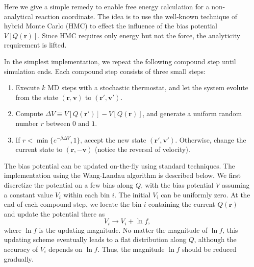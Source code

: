\documentclass{article}
\newcommand{\vct}[1]{\mathbf{#1}}
\newcommand{\vr}{\vct{r}}
\newcommand{\vv}{\vct{v}}
\begin{document}
%
Here we give a simple remedy
to enable free energy calculation
for a non-analytical reaction coordinate.
%
The idea is to use
the well-known technique of hybrid Monte Carlo (HMC)
to effect the influence of the bias potential $V[Q(\vr)]$.
%
Since HMC requires only energy but not the force,
the analyticity requirement is lifted.



%
In the simplest implementation, 
we repeat the following compound step until simulation ends.
%
Each compound step consists of three small steps:
%
\begin{enumerate}
  \item Execute $k$ MD steps with a stochastic thermostat,
        and let the system evolute
        from the state $(\vr, \vv)$ to $(\vr', \vv')$.

  \item Compute $\Delta V \equiv V[Q(\vr')] - V[Q(\vr)]$,
        and generate a uniform random number $r$ between $0$ and $1$.

  \item If $r < \min\{e^{-\beta \Delta V}, 1\}$,
        accept the new state $(\vr', \vv')$.
        Otherwise, change the current state to $(\vr, -\vv)$
        (notice the reversal of velocity).
\end{enumerate}



%
The bias potential can be updated on-the-fly
using standard techniques.
%
The implementation using the Wang-Landau algorithm
is described below.
%
We first discretize the potential on a few bins along $Q$,
with the bias potential $V$ assuming a constant value $V_i$
within each bin $i$.
%
The initial $V_i$ can be uniformly zero.
%
At the end of each compound step,
we locate the bin $i$ containing the current $Q(\vr)$
and update the potential there as
%
\begin{equation}
V_i \rightarrow V_i + \ln f,
\end{equation}
%
where $\ln f$ is the updating magnitude.
%
No matter the magnitude of $\ln f$,
this updating scheme eventually leads to a flat distribution along $Q$,
although the accuracy of $V_i$ depends on $\ln f$.
%
Thus, the magnitude $\ln f$ should be reduced gradually.


\end{document}
